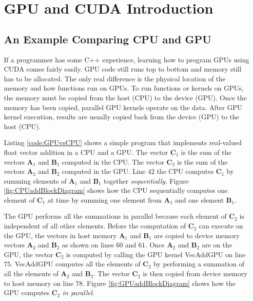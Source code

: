 \section{GPU and CUDA Introduction}
\subsection{An Example Comparing CPU and GPU}
If a programmer has some C++ experience, learning how to program GPUs using CUDA comes fairly easily.
GPU code still runs top to bottom and memory still has to be allocated.
The only real difference is the physical location of the memory and how functions run on GPUs.
To run functions or kernels on GPUs, the memory must be copied from the host (CPU) to the device (GPU).
Once the memory has been copied, parallel GPU kernels operate on the data.
After GPU kernel execution, results are usually copied back from the device (GPU) to the host (CPU).

Listing \ref{code:GPUvsCPU} shows a simple program that implements real-valued float vector addition in a CPU and a GPU.
The vector $\mathbf{C}_1$ is the sum of the vectors $\mathbf{A}_1$ and $\mathbf{B}_1$ computed in the CPU.
The vector $\mathbf{C}_2$ is the sum of the vectors $\mathbf{A}_2$ and $\mathbf{B}_2$ computed in the GPU.
Line $42$ the CPU computes $\mathbf{C}_1$ by summing elements of $\mathbf{A}_1$ and $\mathbf{B}_1$ together \textit{sequentially}. Figure \ref{fig:CPUaddBlockDiagram} shows how the CPU 
sequentially computes one element of $\mathbf{C}_1$ at time by summing one element from $\mathbf{A}_1$ and one element $\mathbf{B}_1$.

The GPU performs all the summations in parallel because each element of $\mathbf{C}_2$ is independent of all other elements. 
Before the computation of $\mathbf{C}_2$ can execute on the GPU, the vectors in host memory $\mathbf{A}_1$ and $\mathbf{B}_1$ are copied to device memory vectors $\mathbf{A}_2$ and $\mathbf{B}_2$ as shown on lines $60$ and $61$.
Once $\mathbf{A}_2$ and $\mathbf{B}_2$ are on the GPU, the vector $\mathbf{C}_2$ is computed by calling the GPU kernel VecAddGPU on line $75$.
VecAddGPU computes all the elements of $\mathbf{C}_2$ by performing a summation of all the elements of $\mathbf{A}_2$ and $\mathbf{B}_2$.
The vector $\mathbf{C}_2$ is then copied from device memory to host memory on line $78$.
Figure \ref{fig:GPUaddBlockDiagram} shows how the GPU computes $\mathbf{C}_2$ \textit{in parallel}.

